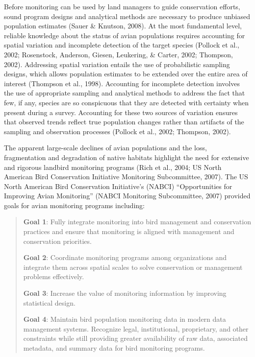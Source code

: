 \documentclass[
  letterpaper,
  DIV=11,
  numbers=noendperiod,
  oneside]{scrreprt}
\begin{document}
Before monitoring can be used by land managers to guide conservation
efforts, sound program designs and analytical methods are necessary to
produce unbiased population estimates (Sauer \& Knutson, 2008). At the
most fundamental level, reliable knowledge about the status of avian
populations requires accounting for spatial variation and incomplete
detection of the target species (Pollock et al., 2002; Rosenstock,
Anderson, Giesen, Leukering, \& Carter, 2002; Thompson, 2002).
Addressing spatial variation entails the use of probabilistic sampling
designs, which allows population estimates to be extended over the
entire area of interest (Thompson et al., 1998). Accounting for
incomplete detection involves the use of appropriate sampling and
analytical methods to address the fact that few, if any, species are so
conspicuous that they are detected with certainty when present during a
survey. Accounting for these two sources of variation ensures that
observed trends reflect true population changes rather than artifacts of
the sampling and observation processes (Pollock et al., 2002; Thompson,
2002).

The apparent large-scale declines of avian populations and the loss,
fragmentation and degradation of native habitats highlight the need for
extensive and rigorous landbird monitoring programs (Rich et al., 2004;
US North American Bird Conservation Initiative Monitoring Subcommittee,
2007). The US North American Bird Conservation Initiative's (NABCI)
``Opportunities for Improving Avian Monitoring'' (NABCI Monitoring
Subcommittee, 2007) provided goals for avian monitoring programs
including:

\begin{quote}
\textbf{Goal 1}: Fully integrate monitoring into bird management and
conservation practices and ensure that monitoring is aligned with
management and conservation priorities.

\textbf{Goal 2}: Coordinate monitoring programs among organizations and
integrate them across spatial scales to solve conservation or management
problems effectively.

\textbf{Goal 3}: Increase the value of monitoring information by
improving statistical design.

\textbf{Goal 4}: Maintain bird population monitoring data in modern data
management systems. Recognize legal, institutional, proprietary, and
other constraints while still providing greater availability of raw
data, associated metadata, and summary data for bird monitoring
programs.
\end{quote}
\end{document}

